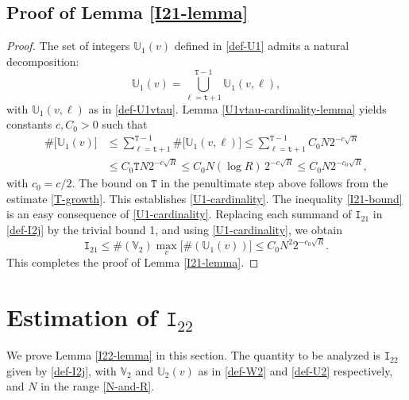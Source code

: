 \documentclass[12pt, twoside]{article}
\theoremstyle{definition}
\numberwithin{equation}{section}
\begin{document}
\subsection{Proof of Lemma \ref{I21-lemma}} 
\begin{proof} 
The set of integers $\mathbb U_1(v)$ defined in \eqref{def-U1} admits a natural decomposition: 
\[ \mathbb U_1(v) = \bigcup_{\ell = \mathtt t+1}^{\mathtt T-1} \mathbb U_1(v, \ell),  \]
with $\mathbb U_1(v, \ell)$ as in \eqref{def-U1vtau}.  Lemma \ref{U1vtau-cardinality-lemma} yields constants $c, C_0 > 0$ such that  
\begin{align*}  \# \bigl[ \mathbb U_1(v) \bigr] &\leq \sum_{\ell=\mathtt t+1}^{\mathtt T-1}  \# \bigl[ \mathbb U_1(v, \ell) \bigr] \leq  \sum_{\ell=\mathtt t+1}^{\mathtt T-1} C_0 N 2^{-c\sqrt{R}} \\
&\leq C_0 \mathtt T N 2^{-c \sqrt{R}} \leq C_0 N (\log R) \, 2^{-c \sqrt{R}} \leq C_0 N 2^{-c_0\sqrt{R}}, 
\end{align*}  
with $c_0 = c/2$. The bound on $\mathtt T$ in the penultimate step above follows from the estimate \eqref{T-growth}. This establishes \eqref{U1-cardinality}.  
 \vskip0.1in
\noindent The inequality \eqref{I21-bound} is an easy consequence of \eqref{U1-cardinality}. Replacing each summand of $\mathtt I_{21}$ in \eqref{def-I2j} by the trivial bound 1, and using \eqref{U1-cardinality}, we obtain 
\[ \mathtt I_{21} \leq \#(\mathbb V_2) \max_{v} \bigl[ \#(\mathbb U_1(v)) \bigr] \leq C_0 N^2 2^{-c_0 \sqrt{R}}.\]
This completes the proof of Lemma \ref{I21-lemma}.  
\end{proof} 


\section{Estimation of $\mathtt I_{22}$} \label{I22-estimation-section} 
We prove Lemma \ref{I22-lemma} in this section. The quantity to be analyzed is $\mathtt I_{22}$ given by \eqref{def-I2j}, with $\mathbb V_2$ and $\mathbb U_2(v)$ as in \eqref{def-W2} and \eqref{def-U2} respectively, and $N$ in the range \eqref{N-and-R}.   
\end{document}

